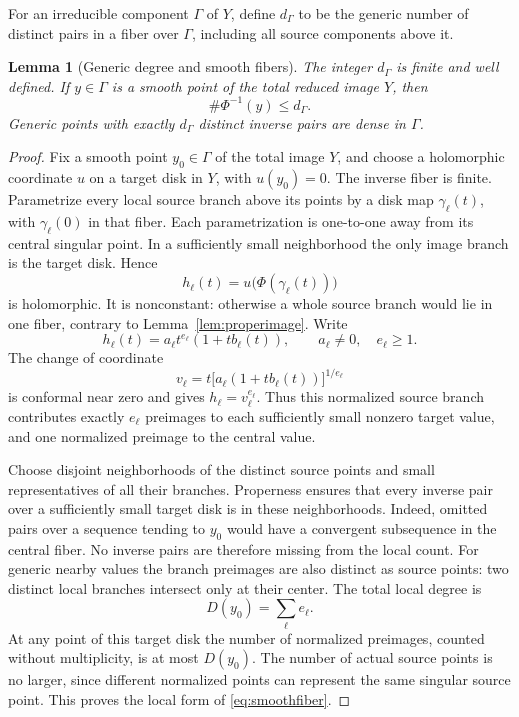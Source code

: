 \documentclass[11pt,reqno]{amsart}
\newtheorem{lemma}[theorem]{Lemma}
\theoremstyle{remark}
\numberwithin{equation}{section}
\begin{document}
For an irreducible component $\Gamma$ of $Y$, define $d_\Gamma$ to be
the generic number of distinct pairs in a fiber over $\Gamma$,
including all source components above it.

\begin{lemma}[Generic degree and smooth fibers]\label{lem:degree}
The integer $d_\Gamma$ is finite and well defined. If $y\in\Gamma$ is
a smooth point of the total reduced image $Y$, then
\begin{equation}\label{eq:smoothfiber}
 \#\Phi^{-1}(y)\le d_\Gamma.
\end{equation}
Generic points with exactly $d_\Gamma$ distinct inverse pairs are
dense in $\Gamma$.
\end{lemma}

\begin{proof}
Fix a smooth point $y_0\in\Gamma$ of the total image $Y$, and choose a
holomorphic coordinate $u$ on a target disk in $Y$, with $u(y_0)=0$.
The inverse fiber is finite. Parametrize every local source branch
above its points by a disk map $\gamma_\ell(t)$, with
$\gamma_\ell(0)$ in that fiber. Each parametrization is one-to-one
away from its central singular point. In a sufficiently small
neighborhood the only image branch is the target disk. Hence
\[
 h_\ell(t)=u\bigl(\Phi(\gamma_\ell(t))\bigr)
\]
is holomorphic. It is nonconstant: otherwise a whole source branch
would lie in one fiber, contrary to Lemma~\ref{lem:properimage}.
Write
\[
 h_\ell(t)=a_\ell t^{e_\ell}(1+t b_\ell(t)),
 \qquad a_\ell\ne0,\quad e_\ell\ge1.
\]
The change of coordinate
\[
 v_\ell=t\bigl[a_\ell(1+t b_\ell(t))\bigr]^{1/e_\ell}
\]
is conformal near zero and gives $h_\ell=v_\ell^{e_\ell}$.
Thus this normalized source branch contributes exactly $e_\ell$
preimages to each sufficiently small nonzero target value, and
one normalized preimage to the central value.

Choose disjoint neighborhoods of the distinct source points and
small representatives of all their branches. Properness ensures
that every inverse pair over a sufficiently small target disk is
in these neighborhoods. Indeed, omitted pairs over a sequence
tending to $y_0$ would have a convergent subsequence in the
central fiber. No inverse pairs are therefore missing from the
local count. For generic nearby values the branch preimages are
also distinct as source points: two distinct local branches
intersect only at their center. The total local degree is
\begin{equation}\label{eq:localsumdegree}
 D(y_0)=\sum_\ell e_\ell.
\end{equation}
At any point of this target disk the number of normalized
preimages, counted without multiplicity, is at most $D(y_0)$.
The number of actual source points is no larger, since different
normalized points can represent the same singular source point.
This proves the local form of \eqref{eq:smoothfiber}.


\end{proof}
\end{document}
